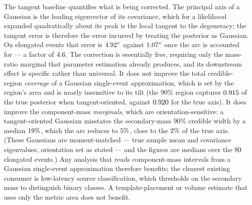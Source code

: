 \documentclass[aps,preprint,amsmath,amssymb,nofootinbib,superscriptaddress]{revtex4-2}
\begin{document}
The tangent baseline quantifies what is being corrected. The principal axis of a Gaussian is the leading
eigenvector of its covariance, which for a likelihood expanded quadratically about its peak is the local
tangent to the degeneracy; the tangent error is therefore the error incurred by treating the posterior as
Gaussian. On elongated events that error is $4.92^\circ$ against $1.07^\circ$ once
the arc is accounted for --- a factor of $4.6$. The correction is essentially free, requiring only
the mass-ratio marginal that parameter estimation already produces, and its downstream effect is specific
rather than universal. It does not improve the total credible-region \emph{coverage} of a Gaussian
single-event approximation, which is set by the region's area and is nearly insensitive to its tilt (the
$90\%$ region captures $0.915$ of the true posterior when tangent-oriented, against
$0.920$ for the true axis). It does improve the component-mass \emph{marginals}, which are
orientation-sensitive: a tangent-oriented Gaussian misstates the secondary-mass $90\%$ credible width by a
median $19\%$, which the arc reduces to $5\%$, close to the $2\%$ of the true
axis. (These Gaussians are moment-matched --- true sample mean and covariance eigenvalues, orientation
set as stated --- and the figures are medians over the $80$ elongated events.) Any analysis
that reads component-mass intervals from a Gaussian single-event approximation therefore benefits; the
clearest existing consumer is low-latency source classification, which thresholds on the secondary mass
to distinguish binary classes. A template-placement or volume estimate that uses only the metric area
does not benefit.
\end{document}
